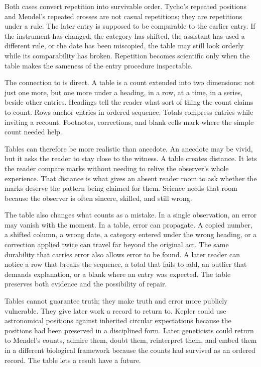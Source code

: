 Both cases convert repetition into survivable order. Tycho's repeated
positions and Mendel's repeated crosses are not casual repetitions; they
are repetitions under a rule. The later
entry is supposed to be comparable to the earlier entry. If the instrument
has changed, the category has shifted, the assistant has used a different
rule, or the date has been miscopied, the table may still look orderly
while its comparability has broken. Repetition becomes scientific only when
the table makes the sameness of the entry procedure inspectable.

The connection to  is direct. A table is a count extended
into two dimensions: not just one more, but one more under a heading, in a
row, at a time, in a series, beside other entries. Headings tell the reader
what sort of thing the count claims to count. Rows anchor entries in
ordered sequence. Totals compress entries while inviting a recount.
Footnotes, corrections, and blank cells mark where the simple count needed
help.

Tables can therefore be more realistic than anecdote. An anecdote may be
vivid, but it asks the reader to stay close to the witness. A table creates
distance. It lets the reader compare marks without needing to relive the
observer's whole experience. That distance is what gives an absent reader
room to ask whether the marks deserve the pattern being claimed for them.
Science needs that room because the observer is often sincere, skilled, and
still wrong.

The table also changes what counts as a mistake. In a single observation,
an error may vanish with the moment. In a table, error can propagate. A
copied number, a shifted column, a wrong date, a category entered under the
wrong heading, or a correction applied twice can travel far beyond the
original act. The same durability that carries error also allows error to
be found. A later reader can notice a row that breaks the sequence, a total
that fails to add, an outlier that demands explanation, or a blank where an
entry was expected. The table preserves both evidence and the possibility
of repair.

Tables cannot guarantee truth; they make truth and error more publicly
vulnerable. They give later work a record to return to. Kepler could use
astronomical positions against inherited circular expectations because the
positions had been preserved in a disciplined form. Later geneticists could
return to Mendel's counts, admire them, doubt them, reinterpret them, and
embed them in a different biological framework because the counts had
survived as an ordered record. The table lets a result have a future.

